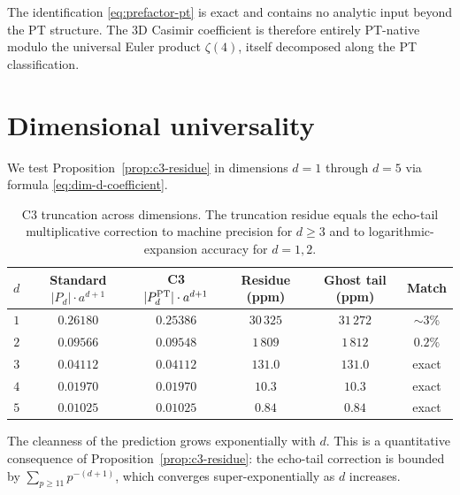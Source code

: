 \documentclass[11pt,a4paper]{article}
\begin{document}
The identification \eqref{eq:prefactor-pt} is exact and contains no analytic input beyond the PT
structure. The 3D Casimir coefficient is therefore entirely PT-native modulo the universal Euler
product $\zeta(4)$, itself decomposed along the PT classification.

\section{Dimensional universality}
\label{sec:universality}

We test Proposition~\ref{prop:c3-residue} in dimensions $d = 1$ through $d = 5$ via formula
\eqref{eq:dim-d-coefficient}.

\begin{table}[ht]
\centering
\caption{C3 truncation across dimensions. The truncation residue equals the echo-tail
multiplicative correction to machine precision for $d \geq 3$ and to logarithmic-expansion
accuracy for $d = 1, 2$.}
\label{tab:dimensional-scan}
\begin{tabular}{cccccc}
\toprule
$d$ & Standard $|P_{d}| \cdot a^{d+1}$ & C3 $|P_{d}^{\rm PT}| \cdot a^{d+1}$ & Residue (ppm) & Ghost tail (ppm) & Match \\
\midrule
$1$ & $0.26180$ & $0.25386$ & $30\,325$ & $31\,272$ & $\sim$3\% \\
$2$ & $0.09566$ & $0.09548$ & $1\,809$ & $1\,812$ & $0.2\%$ \\
$3$ & $0.04112$ & $0.04112$ & $131.0$ & $131.0$ & exact \\
$4$ & $0.01970$ & $0.01970$ & $10.3$ & $10.3$ & exact \\
$5$ & $0.01025$ & $0.01025$ & $0.84$ & $0.84$ & exact \\
\bottomrule
\end{tabular}
\end{table}

The cleanness of the prediction grows exponentially with $d$. This is a quantitative consequence
of Proposition~\ref{prop:c3-residue}: the echo-tail correction is bounded by
$\sum_{p \geq 11} p^{-(d+1)}$, which converges super-exponentially as $d$ increases.
\end{document}
